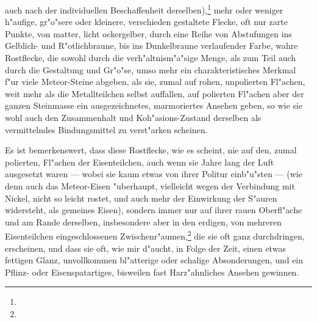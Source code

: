 \documentclass[a4paper, 11pt, oneside, german]{article}
\begin{document}
auch nach der individuellen Beschaffenheit derselben),\footnote{} mehr oder weniger h"aufige, gr"o"sere oder kleinere, verschieden gestaltete Flecke, oft nur zarte Punkte, von matter, licht ockergelber, durch eine Reihe von Abstufungen ins Gelblich- und R"otlichbraune, bis ins Dunkelbraune verlaufender Farbe, wahre Rostflecke, die sowohl durch die verh"altnism"a"sige Menge, als zum Teil auch durch die Gestaltung und Gr"o"se, umso mehr ein charakteristisches Merkmal f"ur viele Meteor-Steine abgeben, als sie, zumal auf rohen, unpolierten Fl"achen, weit mehr als die Metallteilchen selbst auffallen, auf polierten Fl"achen aber der ganzen Steinmasse ein ausgezeichnetes, marmoriertes Ansehen geben, so wie sie wohl auch den Zusammenhalt und Koh"asions-Zustand derselben als vermittelndes Bindungsmittel zu verst"arken scheinen.

Es ist bemerkenswert, dass diese Rostflecke, wie es scheint, nie auf den, zumal polierten, Fl"achen der Eisenteilchen, auch wenn sie Jahre lang der Luft ausgesetzt waren --- wobei sie kaum etwas von ihrer Politur einb"u"sten --- (wie denn auch das Meteor-Eisen "uberhaupt, vielleicht wegen der Verbindung mit Nickel, nicht so leicht rostet, und auch mehr der Einwirkung der S"auren widersteht, als gemeines Eisen), sondern immer nur auf ihrer rauen Oberfl"ache und am Rande derselben, insbesondere aber in den erdigen, von mehreren Eisenteilchen eingeschlossenen Zwischenr"aumen,\footnote{} die sie oft ganz durchdringen, erscheinen, und dass sie oft, wie mir d"aucht, in Folge der Zeit, einen etwas fettigen Glanz, unvollkommen bl"atterige oder schalige Absonderungen, und ein Pflinz- oder Eisenspatartiges, bisweilen fast Harz"ahnliches Ansehen gewinnen.
\end{document}
